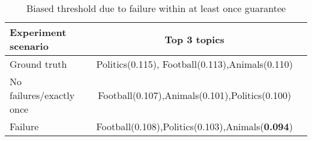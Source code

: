 \begin{table}[htbp]
\caption{Biased threshold due to failure within at least once guarantee}
\begin{threeparttable}
\begin{tabular}{lcl}
Experiment scenario    & Top 3 topics    \\
\hline
Ground truth   &   Politics(0.115), Football(0.113),Animals(0.110)    \\
No failures/exactly once   &   Football(0.107),Animals(0.101),Politics(0.100)    \\
Failure   &   Football(0.108),Politics(0.103),Animals({\bf 0.094})    \\
\end{tabular}
\end{threeparttable}
\label{biased_threshold}
\end{table}

